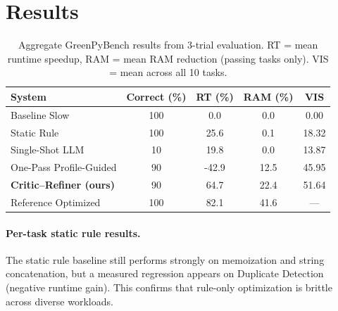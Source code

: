 \documentclass{article}
\begin{document}
\section{Results}

\begin{table}[h]
\centering
\caption{Aggregate GreenPyBench results from 3-trial evaluation. RT = mean runtime speedup, RAM = mean RAM reduction (passing tasks only). VIS = mean across all 10 tasks.}
\label{tab:results}
\small
\begin{tabular}{lcccc}
\toprule
\textbf{System} & \textbf{Correct (\%)} & \textbf{RT (\%)} & \textbf{RAM (\%)} & \textbf{VIS} \\
\midrule
Baseline Slow                   & 100 & 0.0  & 0.0  & 0.00 \\
Static Rule                     & 100 & 25.6 & 0.1  & 18.32 \\
Single-Shot LLM                 & 10  & 19.8  & 0.0  & 13.87 \\
One-Pass Profile-Guided         & 90  & -42.9 & 12.5 & 45.95 \\
\textbf{Critic--Refiner (ours)} & 90  & 64.7  & 22.4 & 51.64 \\
Reference Optimized             & 100 & 82.1 & 41.6 & --- \\
\bottomrule
\end{tabular}
\end{table}

\paragraph{Per-task static rule results.} The static rule baseline still performs strongly on memoization and string concatenation, but a measured regression appears on Duplicate Detection (negative runtime gain). This confirms that rule-only optimization is brittle across diverse workloads.
\end{document}
